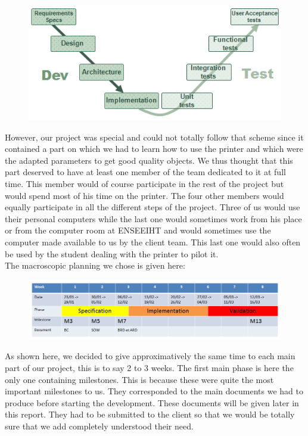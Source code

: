 \documentclass{report}
\begin{document}
\begin{figure}[!h]
\begin{center}
	\includegraphics[scale=4.5]{VCycle}
\end{center}
\end{figure}

However, our project was special and could not totally follow that scheme since it contained a part on which we had to learn how to use the printer and which were the adapted parameters to get good quality objects. We thus thought that this part deserved to have at least one member of the team dedicated to it at full time. This member would of course participate in the rest of the project but would spend most of his time on the printer. The four other members would equally participate in all the different steps of the project. Three of us would use their personal computers while the last one would sometimes work from his place or from the computer room at ENSEEIHT and would sometimes use the computer made available to us by the client team. This last one would also often be used by the student dealing with the printer to pilot it.\\

The macroscopic planning we chose is given here:

\bigskip
\begin{figure}[!h]
\begin{center}
	\includegraphics[scale=0.4]{PlanningMacroscopique}
\end{center}
\end{figure}

As shown here, we decided to give approximatively the same time to each main part of our project, this is to say 2 to 3 weeks. The first main phase is here the only one containing milestones. This is because these were quite the most important milestones to us. They corresponded to the main documents we had to produce before starting the development. These documents will be given later in this report. They had to be submitted to the client so that we would be totally sure that we add completely understood their need.\\
\end{document}
